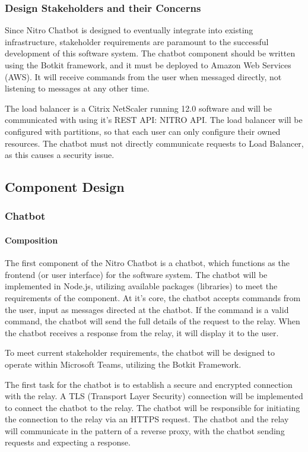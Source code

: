 \subsubsection{Design Stakeholders and their Concerns}
Since Nitro Chatbot is designed to eventually integrate into existing infrastructure, stakeholder requirements are paramount to the successful development of this software system.
The chatbot component should be written using the Botkit framework, and it must be deployed to Amazon Web Services (AWS). 
It will receive commands from the user when messaged directly, not listening to messages at any other time.

The load balancer is a Citrix NetScaler running 12.0 software and will be communicated with using it's REST API: NITRO API.
The load balancer will be configured with partitions, so that each user can only configure their owned resources.
The chatbot must not directly communicate requests to Load Balancer, as this causes a security issue.

\subsection{Component Design}
\subsubsection{Chatbot}
\paragraph{Composition}
The first component of the Nitro Chatbot is a chatbot, which functions as the frontend (or user interface) for the software system.
The chatbot will be implemented in Node.js, utilizing available packages (libraries) to meet the requirements of the component.
At it’s core, the chatbot accepts commands from the user, input as messages directed at the chatbot.
If the command is a valid command, the chatbot will send the full details of the request to the relay.
When the chatbot receives a response from the relay, it will display it to the user.

To meet current stakeholder requirements, the chatbot will be designed to operate within Microsoft Teams, utilizing the Botkit Framework\cite{botkit}.

The first task for the chatbot is to establish a secure and encrypted connection with the relay.
A TLS (Transport Layer Security) connection will be implemented to connect the chatbot to the relay.
The chatbot will be responsible for initiating the connection to the relay via an HTTPS request.
The chatbot and the relay will communicate in the pattern of a reverse proxy, with the chatbot sending requests and expecting a response.


